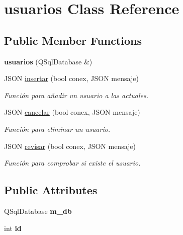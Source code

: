 \hypertarget{classusuarios}{}\section{usuarios Class Reference}
\label{classusuarios}
\subsection*{Public Member Functions}
\begin{DoxyCompactItemize}
\item 
\mbox{\label{classusuarios_a381a1d26233677812b19cb52929eca79}} 
{\bfseries usuarios} (Q\+Sql\+Database \&)
\item 
J\+S\+ON \mbox{\hyperlink{classusuarios_a6939c773dde8627785009eacd28dd9a8}{insertar}} (bool conex, J\+S\+ON mensaje)
\begin{DoxyCompactList}\small\item\em Función para añadir un usuario a las actuales. \end{DoxyCompactList}\item 
J\+S\+ON \mbox{\hyperlink{classusuarios_a3a93fae14bb3554e1b9d4742dd9e6a97}{cancelar}} (bool conex, J\+S\+ON mensaje)
\begin{DoxyCompactList}\small\item\em Función para eliminar un usuario. \end{DoxyCompactList}\item 
J\+S\+ON \mbox{\hyperlink{classusuarios_ad875eae5fff50925fa35dfa80728a87e}{revisar}} (bool conex, J\+S\+ON mensaje)
\begin{DoxyCompactList}\small\item\em Función para comprobar si existe el usuario. \end{DoxyCompactList}\end{DoxyCompactItemize}
\subsection*{Public Attributes}
\begin{DoxyCompactItemize}
\item 
\mbox{\label{classusuarios_a6482c9d76712ca8b33e87fdeb9c6619e}} 
Q\+Sql\+Database {\bfseries m\+\_\+db}
\item 
\mbox{\label{classusuarios_ab69b925316f6d27b13e9ad7b940b3f9f}} 
int {\bfseries id}
\end{DoxyCompactItemize}


